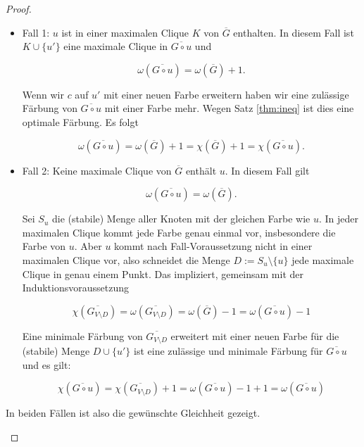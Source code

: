 \documentclass[../main.tex]{subfiles}
\begin{document}
\begin{proof}
\begin{enumerate}[label=(\roman*)]
        \begin{itemize}
            \item Fall 1: $u$ ist in einer maximalen Clique $K$ von $\overline G$ enthalten. In diesem Fall ist $K \cup \{u'\}$ eine maximale Clique in $\overline{G \circ u}$ und
            
            \begin{equation*}
                \omega(\overline{G \circ u}) = \omega(\overline G) + 1.
            \end{equation*}

            Wenn wir $c$ auf $u'$ mit einer neuen Farbe erweitern haben wir eine zulässige Färbung von $\overline{G \circ u}$ mit einer Farbe mehr. Wegen Satz \ref{thm:ineq} ist dies eine optimale Färbung. Es folgt
            
            \begin{equation*}
                \omega(\overline{G \circ u}) = \omega(\overline G) + 1 = \chi(\overline G) + 1 = \chi(\overline{G \circ u}).
            \end{equation*}

            \item Fall 2: Keine maximale Clique von $\overline G$ enthält $u$. In diesem Fall gilt
            
            \begin{equation*}
                \omega(\overline{G \circ u}) = \omega(\overline G).
            \end{equation*}
            
            Sei $S_u$ die (stabile) Menge aller Knoten mit der gleichen Farbe wie $u$. In jeder maximalen Clique kommt jede Farbe genau einmal vor, insbesondere die Farbe von $u$. Aber $u$ kommt nach Fall-Voraussetzung nicht in einer maximalen Clique vor, also schneidet die Menge $D := S_u \setminus \{u\}$ jede maximale Clique in genau einem Punkt. Das impliziert, gemeinsam mit der Induktionsvoraussetzung

            \begin{equation*}
                \chi(\overline{G_{V \setminus D}}) = \omega(\overline{G_{V \setminus D}}) = \omega(\overline G) - 1 = \omega(\overline{G \circ u}) - 1
            \end{equation*}

            Eine minimale Färbung von $\overline{G_{V \setminus D}}$ erweitert mit einer neuen Farbe für die (stabile) Menge $D \cup \{u'\}$ ist eine zulässige und minimale Färbung für $\overline{G \circ u}$ und es gilt:

            \begin{equation*}
                \chi(\overline{G \circ u}) = \chi(\overline{G_{V \setminus D}}) + 1 = \omega(\overline{G \circ u}) - 1 + 1 = \omega(\overline{G \circ u})
            \end{equation*}
        \end{itemize}
        In beiden Fällen ist also die gewünschte Gleichheit gezeigt.
    \end{enumerate}
\end{proof}
\end{document}
